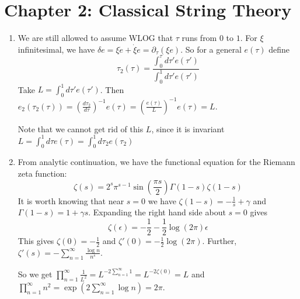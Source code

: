 \documentclass[11pt, class=article, crop=false]{standalone}
\begin{document}
	\section*{Chapter 2: Classical String Theory} %
	\label{sec:chapter_2_classical_string_theory}
	\begin{enumerate}
		\item We are still allowed to assume WLOG that $\tau$ runs from $0$ to $1$. For $\xi$ infinitesimal, we have $\delta e = \xi \dot e + \dot \xi e = \partial_\tau (\xi e)$. So for a general $e(\tau)$ define
		\begin{equation}
			\tau_2(\tau) = \frac{\int_0^\tau d\tau' e(\tau') }{\int_0^1 d\tau' e(\tau')}
		\end{equation} 
		Take $L = \int_0^1 d\tau' e(\tau')$. Then $e_2(\tau_2(\tau)) = \left(\frac{d\tau_2}{d\tau}\right)^{-1} e(\tau) = \left( \frac{e(\tau)}{L} \right)^{-1} e(\tau) = L$.
		
		Note that we cannot get rid of this $L$, since it is invariant $L = \int_0^1 d\tau e(\tau) = \int_0^1 d\tau_2 e(\tau_2)$
		
		
		\item From analytic continuation, we have the functional equation for the Riemann zeta function:
		\begin{equation}
			\zeta(s) = 2^s \pi^{s-1} \sin(\frac{\pi s}{2}) \Gamma(1-s) \zeta(1-s)
		\end{equation}
		It is worth knowing that near $s=0$ we have $\zeta(1-s) = -\frac{1}{s} + \gamma$ and $\Gamma(1-s) = 1 + \gamma s$. Expanding the right hand side about $s = 0$ gives
		\begin{equation}
			\zeta(\epsilon) = -\frac12 - \frac12 \log(2 \pi) \epsilon
		\end{equation}
		This gives $\zeta(0) = -\frac12$ and $\zeta'(0) = -\frac12 \log(2\pi)$. Further, $\zeta'(s) = - \sum_{n=1}^\infty \frac{\log n}{n^s}$. 
		
		So we get $\prod_{n=1}^\infty \frac{1}{L^2} = L^{-2 \sum_{n=1}^\infty 1} = L^{-2 \zeta(0)} = L$ and $\prod_{n=1}^\infty n^2 = \exp\left(2 \sum_{n=1}^\infty \log n \right) = 2\pi$.
		

\end{enumerate}
\end{document}

